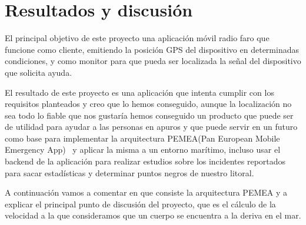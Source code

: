 \chapter{Resultados y discusión}
\label{resultados}


El principal objetivo de este proyecto una aplicación móvil radio faro que
 funcione como cliente, emitiendo la posición GPS del dispositivo en
 determinadas condiciones, y como monitor para que pueda ser
 localizada la señal del dispositivo que solicita ayuda.

El resultado de este proyecto es una aplicación que intenta cumplir 
con los requisitos planteados y creo que lo hemos conseguido, aunque
 la localización no sea todo lo fiable que nos gustaría hemos conseguido 
un producto que puede ser de utilidad para ayudar a las personas
 en apuros y que puede servir en un futuro como base para implementar
 la arquitectura PEMEA(Pan European Mobile Emergency App)~\cite{PEMEA} y aplicar la misma a un entorno
 marítimo, incluso usar el backend de la aplicación para realizar estudios
 sobre los incidentes reportados para sacar estadísticas y determinar
 puntos negros de nuestro litoral.

A continuación vamos a comentar en que consiste la arquitectura PEMEA
 y a explicar el principal punto de discusión del proyecto, que es el cálculo
 de la velocidad a la que consideramos que un cuerpo se encuentra a la
 deriva en el mar.

